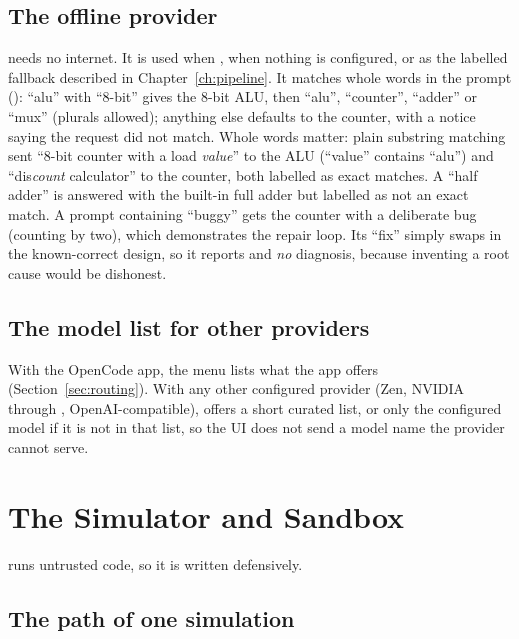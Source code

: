 \section{The offline provider}

 needs no internet. It is used when , when nothing is configured, or as the labelled fallback described in Chapter~\ref{ch:pipeline}. It matches whole words in the prompt (): ``alu'' with ``8-bit'' gives the 8-bit ALU, then ``alu'', ``counter'', ``adder'' or ``mux'' (plurals allowed); anything else defaults to the counter, with a notice saying the request did not match. Whole words matter: plain substring matching sent ``8-bit counter with a load \emph{value}'' to the ALU (``value'' contains ``alu'') and ``dis\emph{count} calculator'' to the counter, both labelled as exact matches. A ``half adder'' is answered with the built-in full adder but labelled as not an exact match. A prompt containing ``buggy'' gets the counter with a deliberate bug (counting by two), which demonstrates the repair loop. Its ``fix'' simply swaps in the known-correct design, so it reports  and \emph{no} diagnosis, because inventing a root cause would be dishonest.

\section{The model list for other providers}

With the OpenCode app, the menu lists what the app offers (Section~\ref{sec:routing}). With any other configured provider (Zen, NVIDIA through , OpenAI-compatible),  offers a short curated list, or only the configured model if it is not in that list, so the UI does not send a model name the provider cannot serve.

\chapter{The Simulator and Sandbox}
\label{ch:simulator}

 runs untrusted code, so it is written defensively.

\section{The path of one simulation}

